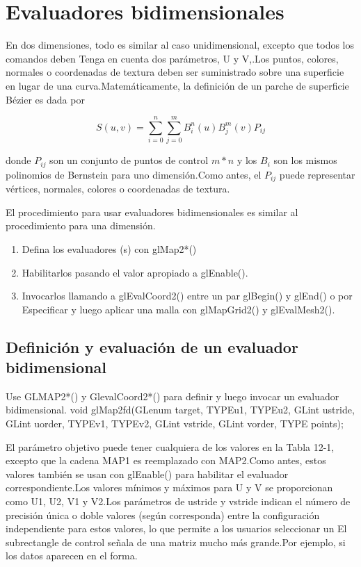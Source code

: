 \documentclass[]{article}
\begin{document}
\section*{Evaluadores bidimensionales}

En dos dimensiones, todo es similar al caso unidimensional, excepto que todos los comandos deben
Tenga en cuenta dos parámetros, U y V,.Los puntos, colores, normales o coordenadas de textura deben ser
suministrado sobre una superficie en lugar de una curva.Matemáticamente, la definición de un parche de superficie Bézier es
dada por


\begin{equation}
    S(u,v)=\sum_{i=0}^{n}\sum_{j=0}^{m} B_{i}^{n}(u) B_{j}^{m}(v)P_{ij}
\end{equation}

donde $P_{ij}$ son un conjunto de puntos de control $m*n$ y los $B_{i}$ son los mismos polinomios de Bernstein para uno
dimensión.Como antes, el $P_{ij}$ puede representar vértices, normales, colores o coordenadas de textura.


El procedimiento para usar evaluadores bidimensionales es similar al procedimiento para una dimensión.


\begin{enumerate}
    \item Defina los evaluadores (s) con glMap2*()
    \item Habilitarlos pasando el valor apropiado a glEnable().
    \item Invocarlos llamando a glEvalCoord2() entre un par glBegin() y glEnd() o por
    Especificar y luego aplicar una malla con glMapGrid2() y glEvalMesh2().
\end{enumerate}


\subsection*{Definición y evaluación de un evaluador bidimensional}


Use GLMAP2*() y GlevalCoord2*() para definir y luego invocar un evaluador bidimensional.
void glMap2{fd}(GLenum target, TYPEu1, TYPEu2, GLint ustride,
GLint uorder, TYPEv1, TYPEv2, GLint vstride,
GLint vorder, TYPE points);

El parámetro objetivo puede tener cualquiera de los valores en la Tabla 12-1, excepto que la cadena MAP1 es
reemplazado con MAP2.Como antes, estos valores también se usan con glEnable() para habilitar el
evaluador correspondiente.Los valores mínimos y máximos para U y V se proporcionan como U1, U2,
V1 y V2.Los parámetros de ustride y vstride indican el número de precisión única o doble
valores (según corresponda) entre la configuración independiente para estos valores, lo que permite a los usuarios seleccionar un
El subrectangle de control señala de una matriz mucho más grande.Por ejemplo, si los datos aparecen en el
forma.
\end{document}
